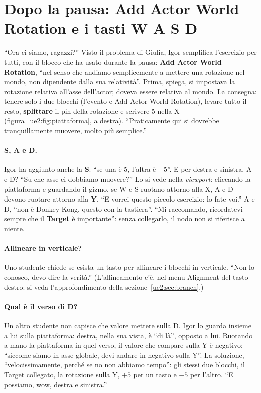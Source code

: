 \section{Dopo la pausa: Add Actor World Rotation e i tasti W A S D}
\label{ue2:sec:wasd}

``Ora ci siamo, ragazzi?'' Visto il problema di Giulia, Igor semplifica l'esercizio per
tutti, con il blocco che ha usato durante la pausa: \textbf{Add Actor World Rotation},
``nel senso che andiamo semplicemente a mettere una rotazione nel mondo, non dipendente
dalla sua relatività''. Prima, spiega, si impostava la rotazione relativa all'asse
dell'actor; doveva essere relativa al mondo. La consegna: tenere solo i due blocchi
(l'evento e Add Actor World Rotation), levare tutto il resto, \textbf{splittare} il pin
della rotazione e scrivere 5 nella X (figura~\ref{ue2:fig:piattaforma}, a destra).
``Praticamente qui si dovrebbe tranquillamente muovere, molto più semplice.''

\paragraph{S, A e D.} Igor ha aggiunto anche la \textbf{S}: ``se una è 5, l'altra è
$-5$''. E per destra e sinistra, A e D? ``Su che asse ci dobbiamo muovere?'' Lo si vede
nella \emph{viewport}: cliccando la piattaforma e guardando il gizmo, se W e S ruotano
attorno alla X, A e D devono ruotare attorno alla \textbf{Y}. ``E vorrei questo piccolo
esercizio: lo fate voi.'' A e D, ``non è Donkey Kong, questo con la tastiera''. ``Mi
raccomando, ricordatevi sempre che il \textbf{Target} è importante'': senza collegarlo, il
nodo non si riferisce a niente.

\paragraph{Allineare in verticale?} Uno studente chiede se esista un tasto per allineare i
blocchi in verticale. ``Non lo conosco, devo dire la verità.'' (L'allineamento c'è, nel
menu Alignment del tasto destro: si veda l'approfondimento della
sezione~\ref{ue2:sec:branch}.)

\paragraph{Qual è il verso di D?} Un altro studente non capisce che valore mettere sulla
D. Igor lo guarda insieme a lui sulla piattaforma: destra, nella sua vista, è ``di là'',
opposto a lui. Ruotando a mano la piattaforma in quel verso, il valore che compare sulla
Y è negativo: ``siccome siamo in asse globale, devi andare in negativo sulla Y''. La
soluzione, ``velocissimamente, perché se no non abbiamo tempo'': gli stessi due blocchi,
il Target collegato, la rotazione sulla Y, $+5$ per un tasto e $-5$ per l'altro. ``E
possiamo, wow, destra e sinistra.''

